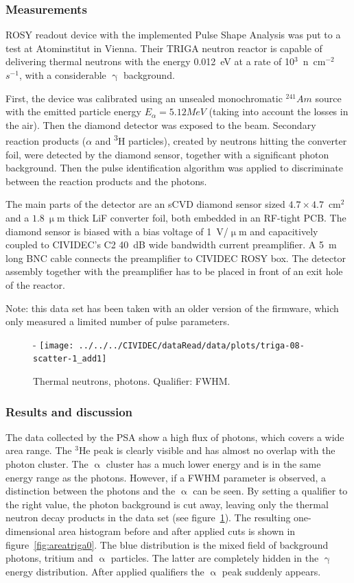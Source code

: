 \subsubsection{Measurements}
ROSY readout device with the implemented Pulse Shape Analysis was put to a test at Atominstitut in Vienna. Their TRIGA neutron reactor is capable of delivering thermal neutrons with the energy 0.012~eV at a rate of 10$^3$~n~cm$^{-2}$ $s^{-1}$, with a considerable $\upgamma$ background. 

First, the device was calibrated using an unsealed monochromatic $^{241}Am$ source with the emitted particle energy $E_\alpha=5.12MeV$ (taking into account the losses in the air). Then the diamond detector was exposed to the beam. Secondary reaction products ($\alpha$ and \textsuperscript{3}H particles), created by neutrons hitting the converter foil, were detected by the diamond sensor, together with a significant photon background. Then the pulse identification algorithm was applied to discriminate between the reaction products and the photons.

The main parts of the detector are an sCVD diamond sensor sized $4.7\times4.7$~cm$^2$ and a $1.8~\upmu$m thick LiF converter foil, both embedded in an RF-tight PCB. The diamond sensor is biased with a bias voltage of 1~V/$\upmu$m  and capacitively coupled to CIVIDEC's C2 40~dB wide bandwidth current preamplifier. A 5~m long BNC cable connects the preamplifier to CIVIDEC ROSY box. The detector assembly together with the preamplifier has to be placed in front of an exit hole of the reactor.

Note: this data set has been taken with an older version of the firmware, which only measured a limited number of pulse parameters.

\begin{figure}[]
\centering-
\texttt{[image: ../../../CIVIDEC/dataRead/data/plots/triga-08-scatter-1\_add1]}
\caption{Thermal neutrons, photons. Qualifier: FWHM.}
\label{fig:scattertriga1}
\end{figure}

\subsubsection{Results and discussion}
The data collected by the PSA show a high flux of photons, which covers a wide area range. The $^3$He peak is clearly visible and has almost no overlap with the photon cluster. The $\upalpha$ cluster has a much lower energy and is in the same energy range as the photons. However, if a FWHM parameter is observed, a distinction between the photons and the $\upalpha$ can be seen. By setting a qualifier to the right value, the photon background is cut away, leaving only the thermal neutron decay products in the data set (see figure~\ref{fig:scattertriga1}). The resulting one-dimensional area histogram before and after applied cuts is shown in figure~\ref{fig:areatriga0}. The blue distribution is the mixed field of background photons, tritium and $\upalpha$ particles. The latter are completely hidden in the $\upgamma$ energy distribution. After applied qualifiers the $\upalpha$ peak suddenly appears.


